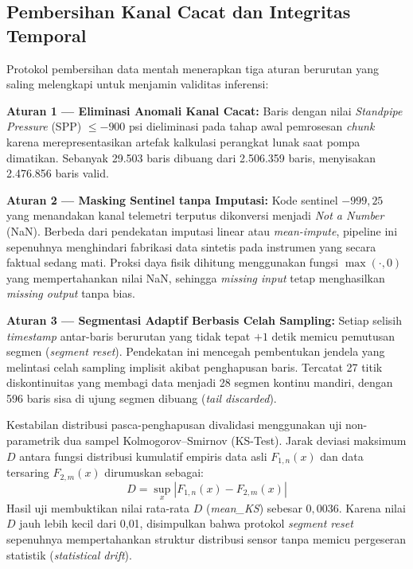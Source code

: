 \documentclass[conference]{IEEEtran}
\begin{document}
\subsection{Pembersihan Kanal Cacat dan Integritas Temporal}
Protokol pembersihan data mentah menerapkan tiga aturan berurutan yang saling melengkapi untuk menjamin validitas inferensi:

\textbf{Aturan 1 --- Eliminasi Anomali Kanal Cacat:} Baris dengan nilai \textit{Standpipe Pressure} (SPP) $\le -900$ psi dieliminasi pada tahap awal pemrosesan \textit{chunk} karena merepresentasikan artefak kalkulasi perangkat lunak saat pompa dimatikan. Sebanyak 29.503 baris dibuang dari 2.506.359 baris, menyisakan 2.476.856 baris valid.

\textbf{Aturan 2 --- Masking Sentinel tanpa Imputasi:} Kode sentinel $-999{,}25$ yang menandakan kanal telemetri terputus dikonversi menjadi \textit{Not a Number} (NaN). Berbeda dari pendekatan imputasi linear atau \textit{mean-impute}, pipeline ini sepenuhnya menghindari fabrikasi data sintetis pada instrumen yang secara faktual sedang mati. Proksi daya fisik dihitung menggunakan fungsi $\max(\cdot, 0)$ yang mempertahankan nilai NaN, sehingga \textit{missing input} tetap menghasilkan \textit{missing output} tanpa bias.

\textbf{Aturan 3 --- Segmentasi Adaptif Berbasis Celah Sampling:} Setiap selisih \textit{timestamp} antar-baris berurutan yang tidak tepat $+1$ detik memicu pemutusan segmen (\textit{segment reset}). Pendekatan ini mencegah pembentukan jendela yang melintasi celah sampling implisit akibat penghapusan baris. Tercatat 27 titik diskontinuitas yang membagi data menjadi 28 segmen kontinu mandiri, dengan 596 baris sisa di ujung segmen dibuang (\textit{tail discarded}).

Kestabilan distribusi pasca-penghapusan divalidasi menggunakan uji non-parametrik dua sampel Kolmogorov--Smirnov (KS-Test). Jarak deviasi maksimum $D$ antara fungsi distribusi kumulatif empiris data asli $F_{1,n}(x)$ dan data tersaring $F_{2,m}(x)$ dirumuskan sebagai:
\begin{equation}
D = \sup_x \left| F_{1,n}(x) - F_{2,m}(x) \right|
\end{equation}
Hasil uji membuktikan nilai rata-rata $D$ (\textit{mean\_KS}) sebesar $0{,}0036$. Karena nilai $D$ jauh lebih kecil dari 0{,}01, disimpulkan bahwa protokol \textit{segment reset} sepenuhnya mempertahankan struktur distribusi sensor tanpa memicu pergeseran statistik (\textit{statistical drift}).
\end{document}
